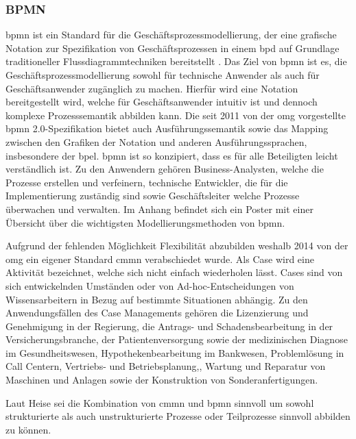 \documentclass[a4paper, 12pt, twoside, headsepline=true]{scrartcl} %
\begin{document}
\subsubsection{BPMN}

\ac{bpmn} ist ein Standard für die Geschäftsprozessmodellierung, der eine grafische Notation zur Spezifikation von Geschäftsprozessen in einem \ac{bpd} auf Grundlage traditioneller Flussdiagrammtechniken bereitstellt \cite[S.222]{Aagesen2015} 
. Das Ziel von \ac{bpmn} ist es, die Geschäftsprozessmodellierung sowohl für technische Anwender als auch für Geschäftsanwender  zugänglich zu machen. Hierfür wird eine Notation bereitgestellt wird, welche für Geschäftsanwender intuitiv ist und dennoch komplexe Prozesssemantik abbilden kann. Die seit 2011 von der \ac{omg} vorgestellte \ac{bpmn} 2.0-Spezifikation bietet auch Ausführungssemantik sowie das Mapping zwischen den Grafiken der Notation und anderen Ausführungssprachen, insbesondere der \ac{bpel}. \ac{bpmn} ist so konzipiert, dass es für alle Beteiligten leicht verständlich ist.
Zu den Anwendern gehören Business-Analysten, welche die Prozesse erstellen und verfeinern, technische Entwickler, die für die Implementierung zuständig sind sowie Geschäftsleiter welche Prozesse überwachen und verwalten. Im Anhang befindet sich ein Poster mit einer Übersicht über die wichtigsten Modellierungsmethoden von \ac{bpmn}. 

Aufgrund der fehlenden Möglichkeit Flexibilität abzubilden weshalb 2014 von der \ac{omg} ein eigener Standard \ac{cmmn} verabschiedet wurde. Als Case wird eine Aktivität bezeichnet, welche sich nicht einfach wiederholen lässt. Cases sind  von sich entwickelnden Umständen oder von Ad-hoc-Entscheidungen von Wissensarbeitern in Bezug auf  bestimmte Situationen abhängig. Zu den Anwendungsfällen des Case Managements gehören die Lizenzierung und Genehmigung in der Regierung, die Antrags- und Schadensbearbeitung in der Versicherungsbranche, der Patientenversorgung sowie der medizinischen Diagnose im Gesundheitswesen,
Hypothekenbearbeitung im Bankwesen, Problemlösung in Call Centern, Vertriebs- und Betriebsplanung,, Wartung und Reparatur von Maschinen und Anlagen sowie der Konstruktion von Sonderanfertigungen.

Laut Heise sei die Kombination von \ac{cmmn} und \ac{bpmn} sinnvoll um sowohl strukturierte als auch unstrukturierte Prozesse oder Teilprozesse sinnvoll abbilden zu können.
\end{document}
